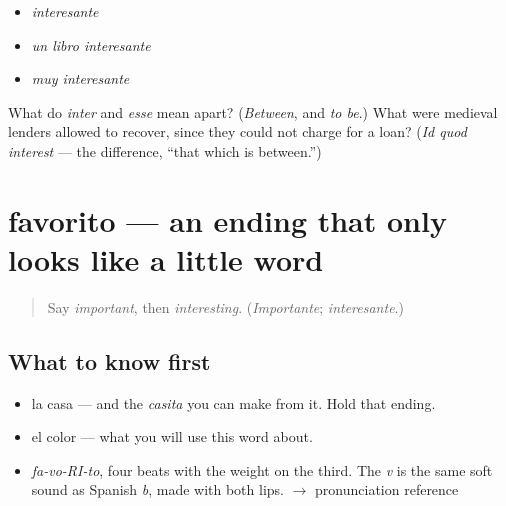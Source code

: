 \begin{itemize}
\raggedright
  \item \emph{interesante}
  \item \emph{un libro interesante}
  \item \emph{muy interesante}
\end{itemize}

\begin{tcolorbox}[breakable,colback=teal!4,colframe=teal!35!black,title={Before you move on}]
What do \emph{inter} and \emph{esse} mean apart? (\emph{Between}, and \emph{to be}.) What were medieval lenders allowed to recover, since they could not charge for a loan? (\emph{Id quod interest} — the difference, \textquotedblleft{}that which is between.\textquotedblright{})
\end{tcolorbox}
\section[favorito]{favorito — an ending that only looks like a little word}

\label{lesson:ES-C398-favorito}



\begin{quote}
Say \emph{important}, then \emph{interesting}. (\emph{Importante}; \emph{interesante}.)
\end{quote}

\subsection*{What to know first}
\begin{itemize}
\raggedright
  \item la casa — and the \emph{casita} you can make from it. Hold that ending.
  \item el color — what you will use this word about.
\end{itemize}

\begin{sounds}
\begin{itemize}
\raggedright
  \item \emph{fa-vo-RI-to}, four beats with the weight on the third. The \emph{v} is the same soft sound as Spanish \emph{b}, made with both lips. $\to$ pronunciation reference
\end{itemize}
\end{sounds}

